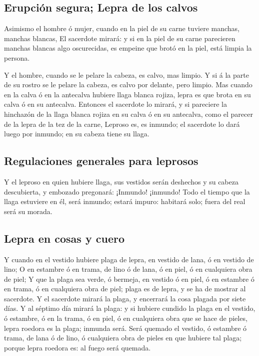 \hypertarget{erupciuxf3n-segura-lepra-de-los-calvos}{%
\subsection{Erupción segura; Lepra de los
calvos}\label{erupciuxf3n-segura-lepra-de-los-calvos}}

 Asimismo el hombre ó mujer, cuando en la piel de su carne
tuviere manchas, manchas blancas,  El sacerdote mirará: y
si en la piel de su carne parecieren manchas blancas algo oscurecidas,
es empeine que brotó en la piel, está limpia la persona.

 Y el hombre, cuando se le pelare la cabeza, es calvo, mas
limpio.  Y si á la parte de su rostro se le pelare la
cabeza, es calvo por delante, pero limpio.  Mas cuando en
la calva ó en la antecalva hubiere llaga blanca rojiza, lepra es que
brota en su calva ó en su antecalva.  Entonces el sacerdote
lo mirará, y si pareciere la hinchazón de la llaga blanca rojiza en su
calva ó en su antecalva, como el parecer de la lepra de la tez de la
carne,  Leproso es, es inmundo; el sacerdote lo dará luego
por inmundo; en su cabeza tiene su llaga.

\hypertarget{regulaciones-generales-para-leprosos}{%
\subsection{Regulaciones generales para
leprosos}\label{regulaciones-generales-para-leprosos}}

 Y el leproso en quien hubiere llaga, sus vestidos serán
deshechos y su cabeza descubierta, y embozado pregonará: ¡Inmundo!
¡inmundo!  Todo el tiempo que la llaga estuviere en él,
será inmundo; estará impuro: habitará solo; fuera del real será su
morada.

\hypertarget{lepra-en-cosas-y-cuero}{%
\subsection{Lepra en cosas y cuero}\label{lepra-en-cosas-y-cuero}}

 Y cuando en el vestido hubiere plaga de lepra, en vestido
de lana, ó en vestido de lino;  O en estambre ó en trama,
de lino ó de lana, ó en piel, ó en cualquiera obra de piel;
 Y que la plaga sea verde, ó bermeja, en vestido ó en piel,
ó en estambre ó en trama, ó en cualquiera obra de piel; plaga es de
lepra, y se ha de mostrar al sacerdote.  Y el sacerdote
mirará la plaga, y encerrará la cosa plagada por siete días.
 Y al séptimo día mirará la plaga: y si hubiere cundido la
plaga en el vestido, ó estambre, ó en la trama, ó en piel, ó en
cualquiera obra que se hace de pieles, lepra roedora es la plaga;
inmunda será.  Será quemado el vestido, ó estambre ó trama,
de lana ó de lino, ó cualquiera obra de pieles en que hubiere tal plaga;
porque lepra roedora es: al fuego será quemada.

